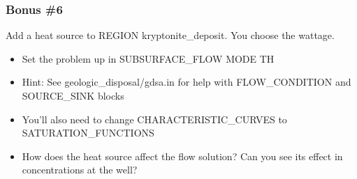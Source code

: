 \documentclass{beamer}
\begin{document}
\begin{frame}[fragile]\frametitle{Bonus \#6}
Add a heat source to REGION kryptonite\_deposit. You choose the wattage.

\begin{itemize}
  \item Set the problem up in SUBSURFACE\_FLOW MODE TH
  \item Hint: See geologic\_disposal/gdsa.in for help with FLOW\_CONDITION and SOURCE\_SINK blocks
  \item You'll also need to change CHARACTERISTIC\_CURVES to SATURATION\_FUNCTIONS
  \item How does the heat source affect the flow solution? Can you see its effect in concentrations at the well?
\end{itemize}

\end{frame}

\end{document}
